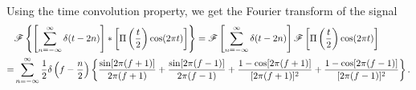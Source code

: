 \documentclass{assignment}
\begin{document}
\begin{sol}
\begin{itemize}
\begin{align}
        \end{align}\normalsize
        Using the time convolution property, we get the Fourier transform of the signal
        \begin{align}
            \notag&\mathscr{F}\left\{\left[\sum_{n=-\infty}^{\infty}\delta(t-2n)\right]*\left[\Pi\left(\frac{t}{2}\right)\cos(2\pi t)\right]\right\}=\mathscr{F}\left[\sum_{n=-\infty}^{\infty}\delta(t-2n)\right]\mathscr{F}\left[\Pi\left(\frac{t}{2}\right)\cos(2\pi t)\right]\\
            =&\sum_{n=-\infty}^{\infty}\frac{1}{2}\delta\left(f-\frac{n}{2}\right)\left\{\frac{\sin[2\pi(f+1)]}{2\pi(f+1)}+\frac{\sin[2\pi(f-1)]}{2\pi(f-1)}+\frac{1-\cos[2\pi(f+1)]}{[2\pi(f+1)]^2}+\frac{1-\cos[2\pi(f-1)]}{[2\pi(f-1)]^2}\right\}.
        \end{align}
    \end{itemize}
\end{sol}
\end{document}
